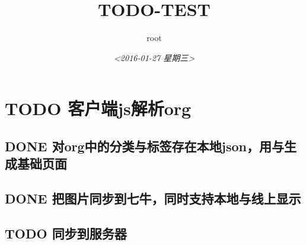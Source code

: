 \documentclass[11pt]{article}
\author{root}
\date{\textit{<2016-01-27 星期三>}}
\title{TODO-TEST}
\begin{document}
\maketitle
\tableofcontents


\section{{\bfseries\sffamily TODO} 客户端js解析org}
\label{sec:orgheadline4}
\subsection{{\bfseries\sffamily DONE} 对org中的分类与标签存在本地json，用与生成基础页面}
\label{sec:orgheadline1}
\subsection{{\bfseries\sffamily DONE} 把图片同步到七牛，同时支持本地与线上显示}
\label{sec:orgheadline2}
\subsection{{\bfseries\sffamily TODO} 同步到服务器}
\label{sec:orgheadline3}
\end{document}
